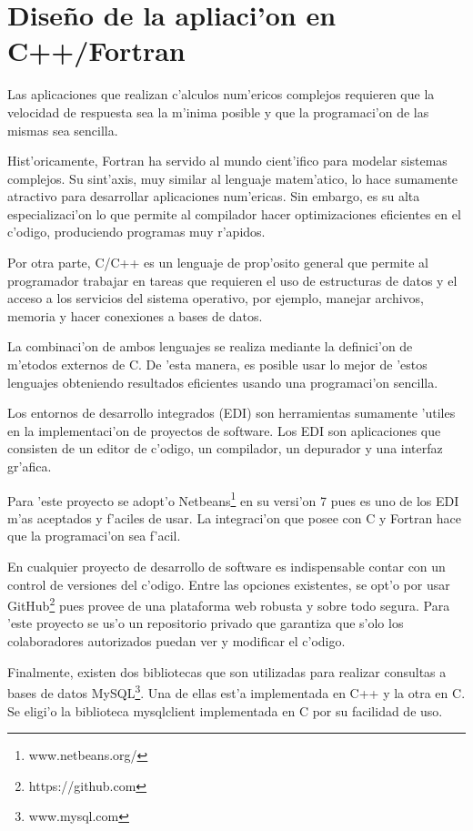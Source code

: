 \section{Dise\~no de la apliaci'on en C++/Fortran}
  Las aplicaciones que realizan c'alculos num'ericos complejos requieren que la velocidad de respuesta sea la m'inima posible y que
  la programaci'on de las mismas sea sencilla.

  Hist'oricamente, Fortran ha servido al mundo cient'ifico para modelar sistemas complejos. Su sint'axis, 
  muy similar al lenguaje matem'atico, lo hace sumamente atractivo para desarrollar aplicaciones num'ericas. Sin embargo,
  es su alta especializaci'on lo que permite al compilador hacer optimizaciones eficientes en el c'odigo, produciendo
  programas muy r'apidos.

  Por otra parte, C/C++ es un lenguaje de prop'osito general que permite al programador trabajar en tareas que requieren
  el uso de estructuras de datos y el acceso a los servicios del sistema operativo, por ejemplo, manejar archivos, memoria y hacer 
  conexiones a bases de datos.

  La combinaci'on de ambos lenguajes se realiza mediante la definici'on de m'etodos externos de C. De 'esta manera, es posible
  usar lo mejor de 'estos lenguajes obteniendo resultados eficientes usando una programaci'on sencilla.


  Los entornos de desarrollo integrados (EDI) son herramientas sumamente 'utiles en la implementaci'on de proyectos de software.
  Los EDI son aplicaciones que consisten de un editor de c'odigo, un compilador, un depurador y una interfaz gr'afica.

  Para 'este proyecto se adopt'o Netbeans\footnote{www.netbeans.org/} en su versi'on 7 pues es uno de los EDI m'as aceptados y f'aciles de usar. La integraci'on
  que posee con C y Fortran hace que la programaci'on sea f'acil.

  En cualquier proyecto de desarrollo de software es indispensable contar con un control de versiones del c'odigo.
  Entre las opciones existentes, se opt'o por usar GitHub\footnote{https://github.com} pues provee de una plataforma web robusta y sobre todo segura. 
  Para 'este proyecto se us'o un repositorio privado que garantiza que s'olo los colaboradores autorizados puedan ver y modificar el c'odigo.

  Finalmente, existen dos bibliotecas que son utilizadas para realizar consultas
  a bases de datos MySQL\footnote{www.mysql.com}. Una de ellas est'a implementada en C++ y la otra en C.
  Se eligi'o la biblioteca mysqlclient implementada en C por su facilidad de uso.

